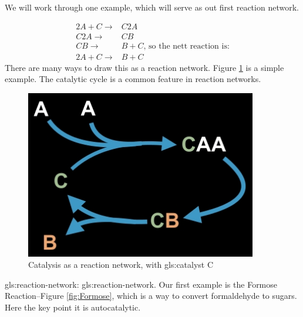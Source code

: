 \documentclass[]{article}
\begin{document}
We will work through one example, which will serve as out first reaction network.

\begin{align*}
	2A + C \rightarrow& C2A \\
	C2A \rightarrow& CB\\
	CB \rightarrow& B + C \text{, so the nett reaction is:}\\
	2A + C \rightarrow& B+C
\end{align*}
There are many ways to draw this as a reaction network. Figure \ref{fig:CatalysisReactionNetwork} is a simple example. The catalytic cycle is a common feature in reaction networks.

\begin{figure}[H]
	\caption{Catalysis as a reaction network, with \gls{gls:catalyst} C}\label{fig:CatalysisReactionNetwork}
	\includegraphics[width=0.9\textwidth]{CatalysisReactionNetwork}
\end{figure}

\Gls{gls:reaction-network}: \glsdesc{gls:reaction-network}. Our first example is the Formose Reaction--Figure \ref{fig:Formose}, which is a way to convert formaldehyde to sugars. Here the key point it is autocatalytic.
\end{document}
